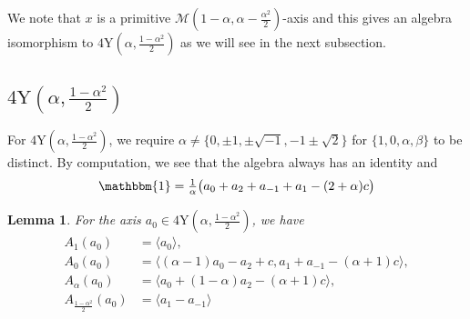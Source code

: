 \documentclass[11pt, a4paper]{article}
\theoremstyle{plain}
\newtheorem{lemma}[theorem]{Lemma}
\theoremstyle{definition}
\newcommand\al{\alpha}
\newcommand\bt{\beta}
\newcommand\cM{\mathcal{M}}
\newcommand\la{\langle}
\newcommand\ra{\rangle}
\newcommand{\Y}{\mathrm{Y}}
\newcommand{\0}{\overline{0}}
\newcommand{\2}{\overline{2}}
\newcommand{\1}{\mathbbm{1}}
\begin{document}
We note that $x$ is a primitive $\cM(1-\al, \al-\frac{\al^2}{2})$-axis and this gives an algebra isomorphism to $4\Y(\al, \frac{1-\al^2}{2})$ as we will see in the next subsection.




\subsection{$4\Y(\al, \frac{1-\al^2}{2})$}

For $4\Y(\al, \frac{1-\al^2}{2})$, we require $\al  \neq \{0, \pm 1, \pm \sqrt{-1}, -1 \pm \sqrt{2} \}$ for $\{1,0,\al,\bt\}$ to be distinct.  By computation, we see that the algebra always has an identity and
\[
\1 = \tfrac{1}{\al}\big(a_0 +a_2 +a_{-1}+ a_1 - (2 + \al)c\big)
\]

\begin{lemma}
	For the axis $a_0 \in 4\Y(\al, \tfrac{1-\al^2}{2})$, we have
	\begin{align*}
		A_1(a_0) &= \la a_0 \ra, \\	
		A_0(a_0) &= \la (\al-1)a_0 - a_2 + c, a_1 +a_{-1} -(\al+1)c \ra, \\
		A_{\al}(a_0) &= \la a_0 +(1-\al)a_{2} -(\al+1)c\ra, \\
		A_{\frac{1-\al^2}{2}}(a_0) &= \la a_1 - a_{-1} \ra 
	\end{align*}
\end{lemma}
\end{document}
